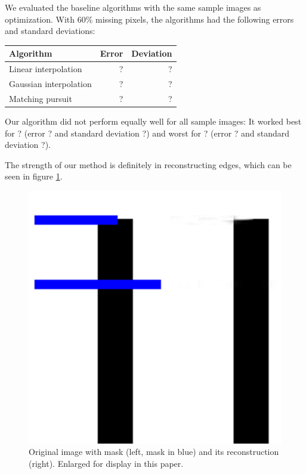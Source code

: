 \documentclass[10pt,conference,compsocconf]{IEEEtran}
\begin{document}
We evaluated the baseline algorithms with the same sample images as optimization. With 60\% missing pixels, the algorithms had the following errors and standard deviations:

\begin{table}[h]
\centering
\begin{tabular}{l|r|r}
Algorithm & Error & Deviation \\
\hline
Linear interpolation & ? & ? \\
Gaussian interpolation & ? & ? \\
Matching pursuit & ? & ? \\
\end{tabular}
\end{table}

Our algorithm did not perform equally well for all sample images: It worked best for ? (error ? and standard deviation ?) and worst for ? (error ? and standard deviation ?).

The strength of our method is definitely in reconstructing edges, which can be seen in figure \ref{edge_reconstruction}.

\begin{figure}
\centering
\includegraphics[width=\columnwidth]{images/paper_reconstruction_bars32_mask8.png}
\caption{Original image with mask (left, mask in blue) and its reconstruction (right). Enlarged for display in this paper.}
\label{edge_reconstruction}
\end{figure}
\end{document}

